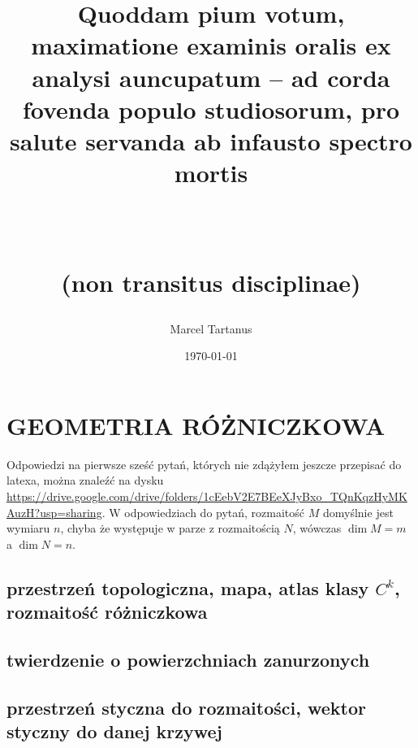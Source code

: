 \documentclass{article}
\title{\begin{Huge}Quoddam pium votum, maximatione examinis oralis ex analysi auncupatum – ad corda fovenda populo studiosorum, pro salute servanda ab infausto spectro mortis\end{Huge} \\ \begin{LARGE} (non transitus disciplinae) \end{LARGE}}
\author{Marcel Tartanus}
\date{\today}
\begin{document}
\maketitle

\section*{\centering GEOMETRIA RÓŻNICZKOWA}

Odpowiedzi na pierwsze sześć pytań, których nie zdążyłem jeszcze przepisać do latexa, można znaleźć na dysku \url{https://drive.google.com/drive/folders/1cEebV2E7BEeXJyBxo_TQnKqzHyMKAuzH?usp=sharing}. W odpowiedziach do pytań, rozmaitość $M$ domyślnie jest wymiaru $n$, chyba że występuje w parze z rozmaitością $N$, wówczas $\dim{M}=m$ a $\dim{N}=n$.

\subsection{przestrzeń topologiczna, mapa, atlas klasy \texorpdfstring{$C^k$}{TEXT}, rozmaitość różniczkowa}










\subsection{twierdzenie o powierzchniach zanurzonych}

\subsection{przestrzeń styczna do rozmaitości, wektor styczny do danej krzywej}
\end{document}
